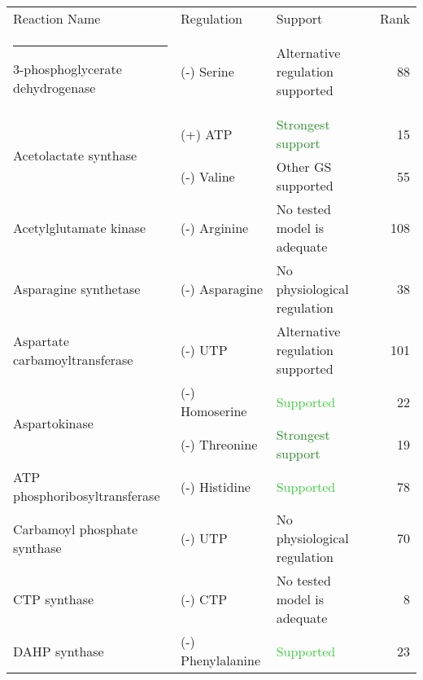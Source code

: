 \documentclass[12pt]{article}\usepackage{graphicx, color}
\makeatletter
\newcommand{\thickhline}{%
    \noalign {\ifnum 0=`}\fi \hrule height 1pt
    \futurelet \reserved@a \@xhline
}
\makeatother
\begin{document}

\begin{table}[ht]
\centering
\begin{tabular}{|l|l|l|r|}
  \hline
Reaction Name & Regulation & Support & Rank \\ 
  \thickhline
3-phosphoglycerate dehydrogenase & (-) Serine & \textcolor{BurntOrange}{Alternative regulation supported} &  88 \\\hline
\multirow{2}{*}{Acetolactate synthase} & (+) ATP & \textcolor{ForestGreen}{Strongest support} &  15 \\ 
   & (-) Valine & Other GS supported &  55 \\\hline
  Acetylglutamate kinase & (-) Arginine & \textcolor{BurntOrange}{No tested model is adequate} & 108 \\\hline 
  Asparagine synthetase & (-) Asparagine & \textcolor{Cerulean}{No physiological regulation} &  38 \\\hline 
  Aspartate carbamoyltransferase & (-) UTP & \textcolor{BurntOrange}{Alternative regulation supported} & 101 \\\hline 
  \multirow{2}{*}{Aspartokinase} & (-) Homoserine & \textcolor{LimeGreen}{Supported} &  22 \\ 
   & (-) Threonine & \textcolor{ForestGreen}{Strongest support} & 19 \\\hline 
  ATP phosphoribosyltransferase & (-) Histidine & \textcolor{LimeGreen}{Supported} &  78 \\\hline 
  Carbamoyl phosphate synthase & (-) UTP & \textcolor{Cerulean}{No physiological regulation} &  70 \\\hline 
  CTP synthase & (-) CTP & \textcolor{BurntOrange}{No tested model is adequate} &   8 \\\hline 
  \multirow{2}{*}{DAHP synthase} & (-) Phenylalanine & \textcolor{LimeGreen}{Supported} &  23 \\ 

\end{tabular}
\end{table}
\end{document}
